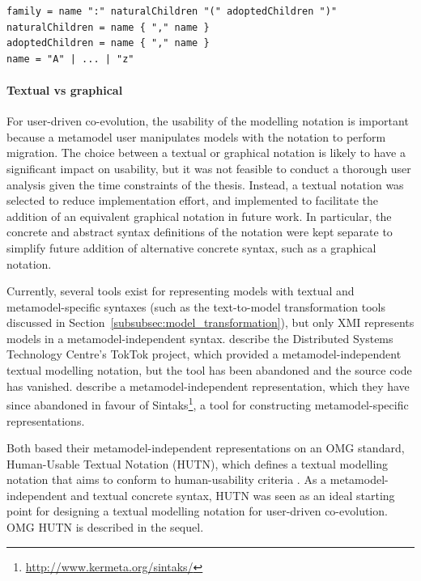 \begin{lstlisting}[caption=A metamodel-specific syntax for families in EBNF, label=lst:mms_syntax, language=EBNF]
family = name ":" naturalChildren "(" adoptedChildren ")"
naturalChildren = name { "," name }
adoptedChildren = name { "," name }
name = "A" | ... | "z"
\end{lstlisting}

\paragraph{Textual vs graphical} For user-driven co-evolution, the usability of the modelling notation is important because a metamodel user manipulates models with the notation to perform migration. The choice between a textual or graphical notation is likely to have a significant impact on usability, but it was not feasible to conduct a thorough user analysis given the time constraints of the thesis. Instead, a textual notation was selected to reduce implementation effort, and implemented to facilitate the addition of an equivalent graphical notation in future work. In particular, the concrete and abstract syntax definitions of the notation were kept separate to simplify future addition of alternative concrete syntax, such as a graphical notation.

Currently, several tools exist for representing models with textual and metamodel-specific syntaxes (such as the text-to-model transformation tools discussed in Section~\ref{subsubsec:model_transformation}), but only XMI represents models in a metamodel-independent syntax. \cite{steel01hutn} describe the Distributed Systems Technology Centre's TokTok project, which provided a me\-ta\-mo\-del-inde\-pe\-nd\-ent textual modelling notation, but the tool has been abandoned and the source code has vanished. \cite{muller05hutn} describe a me\-ta\-mo\-del-inde\-pe\-nd\-ent representation, which they have since abandoned in favour of Sintaks\footnote{\url{http://www.kermeta.org/sintaks/}}, a tool for constructing metamodel-specific representations.

Both \cite{steel01hutn,muller05hutn} based their me\-ta\-mo\-del-independent representations on an OMG standard, Human-Usable Textual Notation (HUTN), which defines a textual modelling notation that aims to conform to human-usability criteria \cite{hutn}. As a me\-ta\-mo\-del-inde\-pe\-nd\-ent and textual concrete syntax, HUTN was seen as an ideal starting point for designing a textual modelling notation for user-driven co-evolution. OMG HUTN is described in the sequel.

